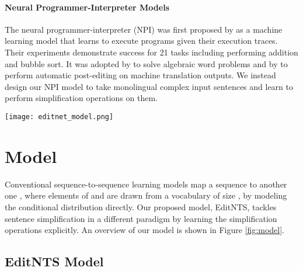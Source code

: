 \documentclass[11pt,a4paper]{article}
\def\editnet{EditNTS}
\begin{document}
\paragraph{Neural Programmer-Interpreter Models}
The neural programmer-interpreter (NPI) was first proposed by \citet{reed2016neural} as a machine learning model that learns to execute programs given their execution traces. Their experiments demonstrate success for 21 tasks including performing addition and bubble sort.  It was adopted by \citet{ling2017program} to solve algebraic word
problems and by \citet{berard2017lig, vu2018automatic} to perform automatic post-editing on machine translation outputs. 
We instead design our NPI model to take monolingual complex input sentences and learn to perform simplification operations on them.


\begin{figure*}[h]
\centering
\texttt{[image: editnet\_model.png]}
\caption{Our model contains two parts: the programmer and the interpreter. At time step , the programmer predicts an edit operation  on the complex word  by considering the interpreter-generated words ,  programmer-generated edit labels , and a context vector  obtained by attending over all words in the complex sentence. The interpreter executes the edit operation   to generate the simplified token   and provides the interpreter context  to the programmer for the next decision. }
\label{fig:model}
\end{figure*}


\section{Model}
Conventional sequence-to-sequence learning models map a sequence  to another one , where elements of  and  are drawn from a vocabulary of size , by modeling the conditional distribution  directly.
Our proposed model, \editnet{}, tackles sentence simplification in a different paradigm by learning the simplification operations explicitly. An overview of our model is shown in Figure \ref{fig:model}.
\subsection{EditNTS Model}
\label{sec:editNTS}
\end{document}
